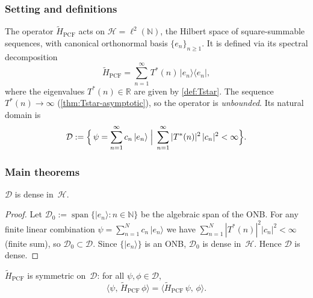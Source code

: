 \subsubsection{Setting and definitions}

The operator $\tilde{H}_{\mathrm{PCF}}$ acts on
$\mathcal{H} = \ell^2(\mathbb{N})$, the Hilbert space of
square-summable sequences, with canonical orthonormal basis
$\{e_n\}_{n\ge 1}$.  It is defined via its spectral decomposition
\begin{equation}\label{eq:HPCF-spectral}
  \tilde{H}_{\mathrm{PCF}}
    = \sum_{n=1}^{\infty} T^*(n)\,|e_n\rangle\langle e_n|,
\end{equation}
where the eigenvalues $T^*(n)\in\mathbb{R}$ are given by
\cref{def:Tstar}.  The sequence $T^*(n)\to\infty$
(\cref{thm:Tstar-asymptotic}), so the operator is
\emph{unbounded}.  Its natural domain is
\begin{equation}\label{eq:domain-HPCF}
  \mathcal{D} := \Bigl\{\,
    \psi = \sum_{n=1}^{\infty} c_n\,|e_n\rangle
    \;\Big|\;
    \sum_{n=1}^{\infty} |T^*(n)|^2\,|c_n|^2 < \infty
  \Bigr\}.
\end{equation}

\subsubsection{Main theorems}

\begin{Theorem}\label{thm:domain-dense}
$\mathcal{D}$ is dense in~$\mathcal{H}$.
\end{Theorem}

\begin{proof}
Let $\mathcal{D}_0 := \operatorname{span}\{|e_n\rangle : n\in\mathbb{N}\}$
be the algebraic span of the ONB.  For any finite linear combination
$\psi = \sum_{n=1}^{N} c_n\,|e_n\rangle$ we have
$\sum_{n=1}^{N} |T^*(n)|^2|c_n|^2 < \infty$ (finite sum),
so $\mathcal{D}_0 \subset \mathcal{D}$.  Since $\{|e_n\rangle\}$ is
an ONB, $\mathcal{D}_0$ is dense in~$\mathcal{H}$.  Hence $\mathcal{D}$
is dense.
\end{proof}

\begin{Theorem}[Hermiticity]\label{thm:hermiticity}
$\tilde{H}_{\mathrm{PCF}}$ is symmetric on~$\mathcal{D}$: for all
$\psi,\phi\in\mathcal{D}$,
\[
  \langle\psi,\,\tilde{H}_{\mathrm{PCF}}\,\phi\rangle
  = \langle\tilde{H}_{\mathrm{PCF}}\,\psi,\,\phi\rangle.
\]
\end{Theorem}

